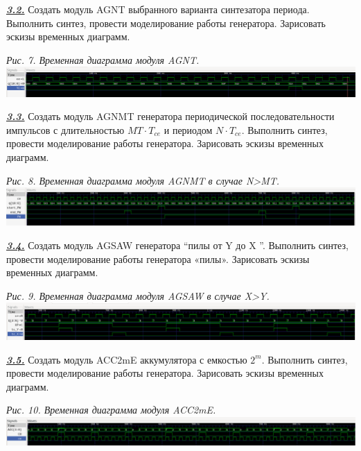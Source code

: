 \documentclass[a4paper]{article}
\begin{document}
\textbf{\textit{\underline{3.2.}}}  Создать модуль AGNT выбранного варианта синтезатора периода. Выполнить синтез, провести моделирование работы генератора. Зарисовать эскизы временных диаграмм.
\begin{center}
	\textit{Рис. 7. Временная диаграмма модуля AGNT.}
	\includegraphics[scale=0.3]{../images/AGNT.png}
\end{center}

\textbf{\textit{\underline{3.3.}}} Создать модуль AGNMT генератора периодической последовательности импульсов с длительностью $MT \cdot T_{ce}$ и периодом $N \cdot T_{ce}$. Выполнить синтез, провести моделирование работы генератора. Зарисовать эскизы временных диаграмм.
\begin{center}
	\textit{Рис. 8. Временная диаграмма модуля AGNMT в случае N>MT.}
	\includegraphics[scale=0.3]{../images/AGNMT_N>MT.png}
\end{center}

\textbf{\textit{\underline{3.4.}}} Создать модуль AGSAW генератора “пилы от Y до X ”. Выполнить синтез, провести моделирование работы генератора «пилы». Зарисовать эскизы временных диаграмм.
\begin{center}
	\textit{Рис. 9. Временная диаграмма модуля AGSAW в случае X>Y.}
	\includegraphics[scale=0.3]{../images/AGSAW_YX_X>Y.png}
\end{center}

\textbf{\textit{\underline{3.5.}}} Создать модуль ACC2mE аккумулятора с емкостью $2^{m}$. Выполнить синтез, провести моделирование работы генератора. Зарисовать эскизы временных диаграмм.
\begin{center}
	\textit{Рис. 10. Временная диаграмма модуля ACC2mE.}
	\includegraphics[scale=0.3]{../images/ACC2mE.png}
\end{center}
\end{document}
